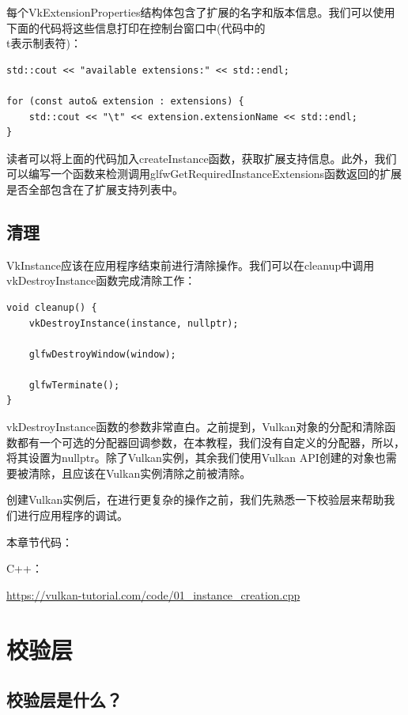 \documentclass{ctexart}
\begin{document}
每个VkExtensionProperties结构体包含了扩展的名字和版本信息。我们可以使用下面的代码将这些信息打印在控制台窗口中(代码中的\\t表示制表符)：

\begin{lstlisting}[language={[ANSI]C}]
std::cout << "available extensions:" << std::endl;

for (const auto& extension : extensions) {
	std::cout << "\t" << extension.extensionName << std::endl;
}
\end{lstlisting}

读者可以将上面的代码加入createInstance函数，获取扩展支持信息。此外，我们可以编写一个函数来检测调用glfwGetRequiredInstanceExtensions函数返回的扩展是否全部包含在了扩展支持列表中。

\subsection{清理}

VkInstance应该在应用程序结束前进行清除操作。我们可以在cleanup中调用vkDestroyInstance函数完成清除工作：

\begin{lstlisting}[language={[ANSI]C}]
void cleanup() {
	vkDestroyInstance(instance, nullptr);

	glfwDestroyWindow(window);

	glfwTerminate();
}
\end{lstlisting}

vkDestroyInstance函数的参数非常直白。之前提到，Vulkan对象的分配和清除函数都有一个可选的分配器回调参数，在本教程，我们没有自定义的分配器，所以，将其设置为nullptr。除了Vulkan实例，其余我们使用Vulkan API创建的对象也需要被清除，且应该在Vulkan实例清除之前被清除。

创建Vulkan实例后，在进行更复杂的操作之前，我们先熟悉一下校验层来帮助我们进行应用程序的调试。

本章节代码：

C++：

\url{https://vulkan-tutorial.com/code/01_instance_creation.cpp}

\newpage
\section{校验层}

\subsection{校验层是什么？}
\end{document}
